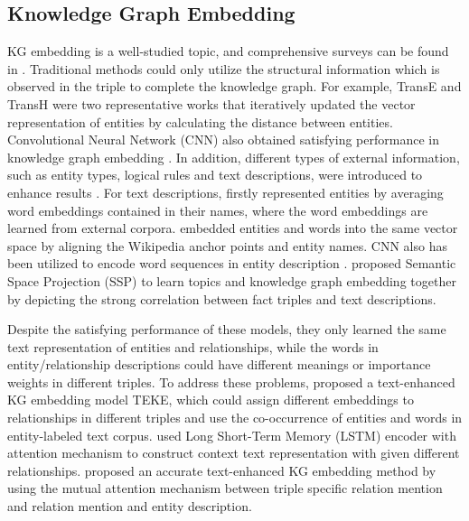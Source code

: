 \documentclass[journal]{IEEEtran}
\begin{document}
\subsection{Knowledge Graph Embedding}
KG embedding is a well-studied topic, and comprehensive surveys can be found in \cite{wang2017knowledge,goyal2018graph}. Traditional methods could only utilize the structural information which is observed in the triple to complete the knowledge graph. For example, TransE \cite{bordes2013translating} and TransH \cite{wang2014knowledge} were two representative works that iteratively updated the vector representation of entities by calculating the distance between entities. Convolutional Neural Network (CNN) also obtained satisfying performance in knowledge graph embedding \cite{dettmers2018convolutional,nguyen2019convolutional,schlichtkrull2018modeling}. In addition, different types of external information, such as entity types, logical rules and text descriptions, were introduced to enhance results \cite{wang2017knowledge}. For text descriptions, \cite{socher2013reasoning} firstly represented entities by averaging word embeddings contained in their names, where the word embeddings are learned from external corpora. \cite{wang2017knowledge} embedded entities and words into the same vector space by aligning the Wikipedia anchor points and entity names. CNN also has been utilized to encode word sequences in entity description \cite{zhang2016collaborative}. \cite{xiao2017ssp} proposed Semantic Space Projection (SSP) to learn topics and knowledge graph embedding together by depicting the strong correlation between fact triples and text descriptions.

Despite the satisfying performance of these models, they only learned the same text representation of entities and relationships, while the words in entity/relationship descriptions could have different meanings or importance weights in different triples. To address these problems, \cite{wang2016text} proposed a text-enhanced KG embedding model TEKE, which could assign different embeddings to relationships in different triples and use the co-occurrence of entities and words in entity-labeled text corpus. \cite{xu2016knowledge} used Long Short-Term Memory (LSTM) encoder with attention mechanism to construct context text representation with given different relationships. \cite{an2018accurate} proposed an accurate text-enhanced KG embedding method by using the mutual attention mechanism between triple specific relation mention and relation mention and entity description.
\end{document}
